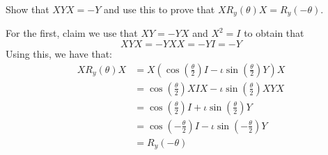 \begin{example}

\end{example}

\begin{example}
    Show that $XYX=-Y$ and use this to prove that $XR_y(\theta)X=R_y(-\theta)$.

    For the first, claim we use that $XY=-YX$ and $X^2=I$ to obtain that
    \[
    XYX=-YXX=-YI=-Y
    \]
    Using this, we have that:
    \begin{align*}
    XR_y(\theta)X&=X\left(\cos\left(\frac{\theta}{2}\right)I-\iota\sin\left(\frac{\theta}{2}\right)Y\right)X\\
    &=\cos\left(\frac{\theta}{2}\right)XIX-\iota \sin\left(\frac{\theta}{2}\right)XYX\\
    &=\cos\left(\frac{\theta}{2}\right) I+\iota \sin\left(\frac{\theta}{2}\right)Y\\
    &=\cos\left(-\frac{\theta}{2}\right)I-\iota \sin\left(-\frac{\theta}{2}\right)Y\\
    &=R_y(-\theta)
    \end{align*}
\end{example}

